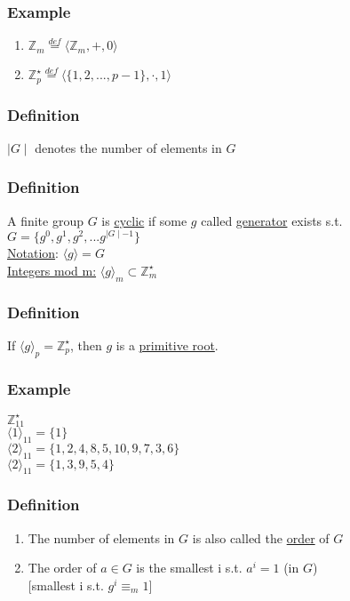\documentclass{report}
\begin{document}
	\subsubsection*{Example}
	\begin{enumerate}
		\item $\mathbb{Z}_m \stackrel{def}{=} \langle \mathbb{Z}_m, +, 0 \rangle$
		\item $\mathbb{Z}_p^{\star} \stackrel{def}{=} \langle \{ 1,2,...,p-1 \} , \cdot, 1 \rangle$
	\end{enumerate}
	\subsubsection*{Definition}
	$\mid G \mid$ denotes the number of elements in $G$
	\subsubsection*{Definition}
	A finite group $G$ is \underline{cyclic} if some $g$ called \underline{generator} exists s.t. $G = \{ g^0, g^1, g^2, ... g^{\mid G \mid - 1}\}$ \\
	\underline{Notation}: $\langle g \rangle = G$ \\
	\underline{Integers mod m:} $\langle g \rangle _m \subset \mathbb{Z}_m^{\star}$
	\subsubsection*{Definition}
	If $\langle g \rangle _p = \mathbb{Z}_p^{\star}$, then $g$ is a \underline{primitive root}.
	\subsubsection*{Example}
	$\mathbb{Z}_{11}^{\star}$ \\
	$\langle 1 \rangle _{11} = \{ 1 \}$ \\
	$\langle 2 \rangle _{11} = \{ 1, 2, 4, 8, 5, 10, 9, 7, 3, 6 \}$ \\
	$\langle 2 \rangle _{11} = \{ 1, 3, 9, 5, 4 \}$ \\
	\subsubsection*{Definition}
	\begin{enumerate}[\textbullet]
		\item The number of elements in $G$ is also called the \underline{order} of $G$
		\item The order of $a \in G$ is the smallest i s.t. $a^i = 1$ (in $G$) \\
		$[$smallest i s.t. $g^i \equiv _m 1]$
	\end{enumerate}
\end{document}
